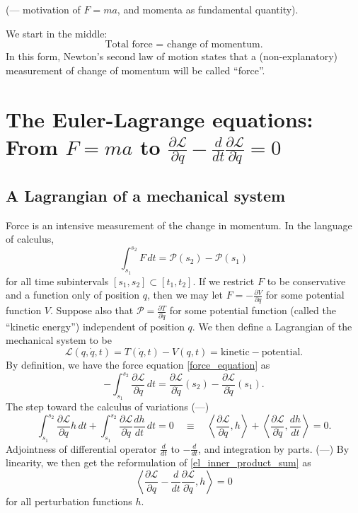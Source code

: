 \documentclass[11pt,a4paper]{memoir}
\newcommand{\fancyL}{\mathcal{L}}
\newcommand{\fancyP}{\mathcal{P}}
\newcommand{\Part}[2]{\frac{\partial #1}{\partial #2}}
\begin{document}
(--- motivation of $F = ma$, and momenta as fundamental quantity).

We start in the middle:
\begin{equation}
    \text{Total force = change of momentum}.
\end{equation}
In this form, Newton's second law of motion states that a (non-explanatory) measurement of change of momentum will be called ``force''.



\section{The Euler-Lagrange equations: \small{From $F = ma$ to $\Part{\fancyL}{q} - \frac{d}{dt}\Part{\fancyL}{\dot{q}} = 0$}} %
\subsection{A Lagrangian of a mechanical system}
Force is an intensive measurement of the change in momentum. In the language of calculus,
\begin{equation}\label{force_equation}
    \int_{s_1}^{s_2} F\,dt = \fancyP(s_2) - \fancyP(s_1)
\end{equation}
for all time subintervals $[s_1, s_2] \subset [t_1, t_2]$. If we restrict $F$ to be conservative and a function only of position $q$, then we may
let $F = -\Part{V}{q}$ for some potential function $V$. Suppose also that $\mathcal{P} = \Part{T}{\dot{q}}$ for some potential function
(called the ``kinetic energy'') independent
of position $q$. We then define a Lagrangian of the mechanical system to be
    $$\fancyL(q, \dot{q}, t) = T(\dot{q}, t) - V(q, t) = \text{kinetic} - \text{potential}.$$
By definition, we have the force equation \eqref{force_equation} as
    $$-\int_{s_1}^{s_2} \Part{\fancyL}{q}\,dt = \Part{\fancyL}{\dot{q}}(s_2) - \Part{\fancyL}{\dot{q}}(s_1).$$
The step toward the calculus of variations (---)
\begin{equation}\label{el_inner_product_sum}
        \int_{s_1}^{s_2} \Part{\fancyL}{q}h\,dt + \int_{s_1}^{s_2} \Part{\fancyL}{\dot{q}}\frac{dh}{dt}\,dt = 0
    \quad\equiv\quad    \left<\Part{\fancyL}{q}, h\right> + \left<\Part{\fancyL}{\dot{q}}, \frac{dh}{dt}\right> = 0.
\end{equation}
Adjointness of differential operator $\frac{d}{dt}$ to $-\frac{d}{dt}$, and integration by parts. (---)
By linearity, we then get the reformulation of \eqref{el_inner_product_sum} as
\newcommand{\gateauxlagrangian}{\Part{\fancyL}{q} - \frac{d}{dt}\Part{\fancyL}{\dot{q}}}
    $$\left<\gateauxlagrangian, h\right> = 0$$
for all perturbation functions $h$.
\end{document}

